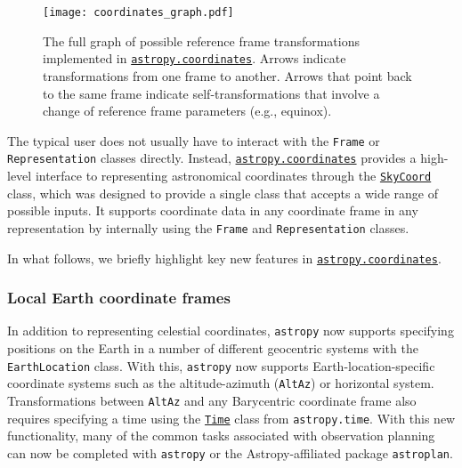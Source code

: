 \documentclass[modern]{aastex62}
\newcommand{\package}[1]{\texttt{#1}\xspace}
\newcommand{\astropy}{Astropy\xspace}
\newcommand{\astropypkg}{\package{astropy}}
\newcommand{\astropysubpkg}[1]{\href{http://docs.astropy.org/en/stable/#1/index.html}{\texttt{astropy.#1}}\xspace}
\newcommand{\astropyskycoord}{\href{http://docs.astropy.org/en/stable/api/astropy.coordinates.SkyCoord.html}{\texttt{SkyCoord}}\xspace}
\newcommand{\astropyTime}{\href{http://docs.astropy.org/en/stable/api/astropy.time.Time.html}{\texttt{Time}}\xspace}
\begin{document}
\begin{figure}
\texttt{[image: coordinates\_graph.pdf]}
\caption{%
    The full graph of possible reference frame transformations implemented in
    \astropysubpkg{coordinates}.
    Arrows indicate transformations from one frame to another.
    Arrows that point back to the same frame indicate self-transformations that
    involve a change of reference frame parameters (e.g., equinox).
    \label{fig:frame-transform-graph}
}
\end{figure}

The typical user does not usually have to interact with the \texttt{Frame} or
\texttt{Representation} classes directly.
Instead, \astropysubpkg{coordinates} provides a high-level interface to
representing astronomical coordinates through the \astropyskycoord class,
which was designed to provide a single class that
accepts a wide range of possible inputs.
It supports coordinate data in any coordinate frame in any representation by
internally using the \texttt{Frame} and \texttt{Representation} classes.

In what follows, we briefly highlight key new features in
\astropysubpkg{coordinates}.

\subsubsection{Local Earth coordinate frames}
In addition to representing celestial
    coordinates, \astropypkg now supports specifying positions on the Earth in
    a number of different geocentric systems with the \texttt{EarthLocation}
    class.
    With this, \astropypkg now supports Earth-location-specific coordinate
    systems such as the altitude-azimuth (\texttt{AltAz}) or horizontal system.
    Transformations between \texttt{AltAz} and any Barycentric coordinate frame
    also requires specifying a time using the \astropyTime class from
    \texttt{astropy.time}.
    With this new functionality, many of the common tasks associated with
    observation planning can now be completed with \astropypkg or the
    \astropy-affiliated package \package{astroplan}\citep{astroplan_AAS}.
\end{document}
